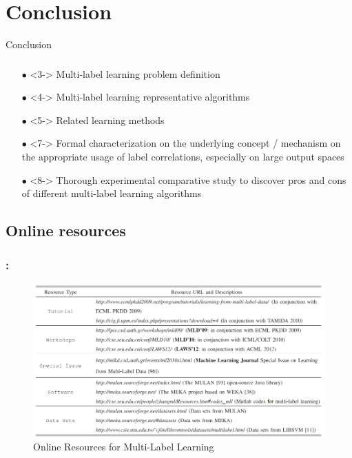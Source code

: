 \documentclass{beamer}
\begin{document}
\section{Conclusion}
\begin{frame}
\Huge{\centerline{Conclusion}}
\end{frame}
\begin{frame}
\frametitle{\insertsection}
\begin{itemize}
\item[$\bullet$] <3-> Multi-label learning problem definition
\item[$\bullet$] <4-> Multi-label learning representative algorithms
\item[$\bullet$] <5-> Related learning methods
\end{itemize}

\begin{itemize}
\item[$\bullet$] <7-> Formal characterization on the underlying concept / mechanism on the appropriate usage of label correlations, especially on large output spaces
\item[$\bullet$] <8-> Thorough experimental comparative study to discover pros and cons of different multi-label learning algorithms
\end{itemize}
\end{frame}

\subsection{Online resources}
\begin{frame}
\frametitle{\insertsection : \insertsubsection}
\begin{figure}
	\begin{center}
		\includegraphics[scale = 0.47]{images/online.png}
		\caption{Online Resources for Multi-Label Learning}
	\end{center}
\end{figure}
\end{frame}
\end{document}
